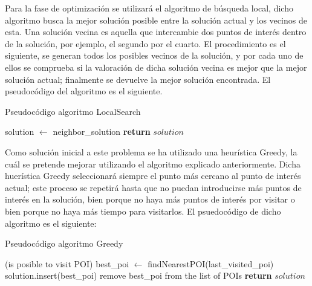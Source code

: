 \vspace{0.06in}
Para la fase de optimización se utilizará el algoritmo de búsqueda local, dicho algoritmo busca la mejor solución posible entre la solución actual y los vecinos de esta. Una solución vecina es aquella que intercambie dos puntos de interés dentro de la solución, por ejemplo, el segundo por el cuarto. El procedimiento es el siguiente, se generan todos los posibles vecinos de la solución, y por cada uno de ellos se comprueba si la valoración de dicha solución vecina es mejor que la mejor solución actual; finalmente se devuelve la mejor solución encontrada. El pseudocódigo del algoritmo es el siguiente.\newline
\begin{algorithm}[H]
	\caption{Pseudocódigo algoritmo LocalSearch}
	\label{alg:local_search}
	\begin{algorithmic}
			\State solution $\gets$ neighbor\_solution
		\EndIf
		\EndFor
		\State \textbf{return} $solution$
		\EndFunction
	\end{algorithmic}
\end{algorithm}

\vspace{0.06in}
Como solución inicial a este problema se ha utilizado una heurística Greedy, la cuál se pretende mejorar utilizando el algoritmo explicado anteriormente. Dicha huerística Greedy seleccionará siempre el punto más cercano al punto de interés actual; este proceso se repetirá hasta que no puedan introducirse más puntos de interés en la solución, bien porque no haya más puntos de interés por visitar o bien porque no haya más tiempo para visitarlos. El psuedocódigo de dicho algoritmo es el siguiente:\newline
\begin{algorithm}[H]
	\caption{Pseudocódigo algoritmo Greedy}
	\label{alg:greedy_alg}
	\begin{algorithmic}
		\Function{Greedy}{solution}
		\While(is posible to visit POI)
			\State best\_poi $\gets$ findNearestPOI(last\_visited\_poi) 
			\State solution.insert(best\_poi) 
			\State remove best\_poi from the list of POIs
		\EndWhile
		\State \textbf{return} $solution$
		\EndFunction
	\end{algorithmic}
\end{algorithm}


